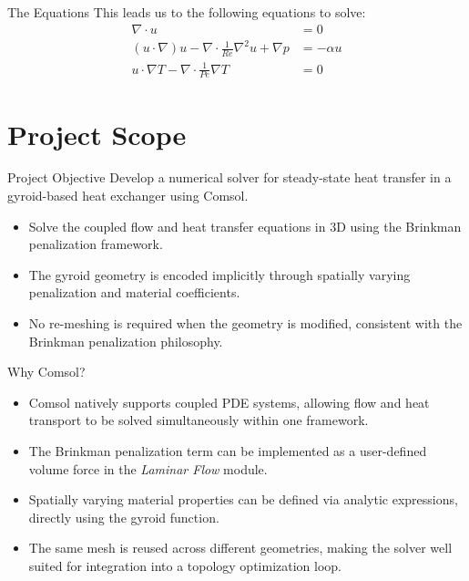 \documentclass{beamer}
\begin{document}
	\begin{frame}{The Equations}
		This leads us to the following equations to solve:
		\begin{align*}
			\nabla \cdot u &= 0 \tag{Cont. eqn.} \\
			(u\cdot \nabla)u-\nabla\cdot\frac1{Re}\nabla^2u+\nabla p &=-\alpha u \tag{Momentum eqn. } \\
			u\cdot\nabla T-\nabla\cdot\frac1{Pe}\nabla T &=0 \tag{Energy eqn. }
		\end{align*}
	\end{frame}
	
	
	
	\section{Project Scope}
	
	\begin{frame}{Project Objective}
		Develop a numerical solver for steady-state heat transfer in a gyroid-based 
		heat exchanger using Comsol.
		\begin{itemize}
			\item Solve the coupled flow and heat transfer equations in 3D using
			the Brinkman penalization framework.
			\pause
			\item The gyroid geometry is encoded implicitly through spatially 
			varying penalization and material coefficients.
			\pause
			\item No re-meshing is required when the geometry is modified, 
			consistent with the Brinkman penalization philosophy.
		\end{itemize}
	\end{frame}
	
	\begin{frame}{Why Comsol?}
		\begin{itemize}
			\item Comsol natively supports coupled PDE systems, allowing flow and heat transport 
			to be solved simultaneously within one framework.
			\pause
			\item The Brinkman penalization term can be implemented as a 
			user-defined volume force in the \emph{Laminar Flow} module.
			\pause
			\item Spatially varying material properties can be defined via analytic 
			expressions, directly using the gyroid function.
			\pause
			\item The same mesh is reused across different geometries, making 
			the solver well suited for integration into a topology optimization loop.
		\end{itemize}
	\end{frame}
	
\end{document}
